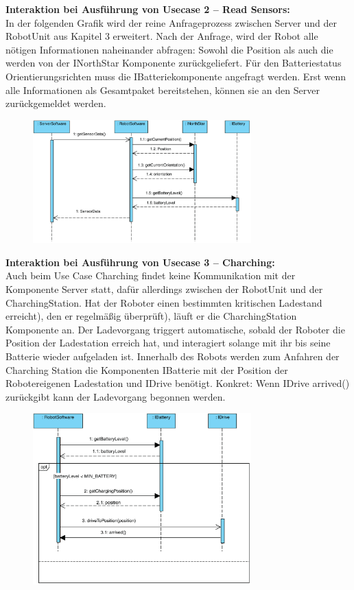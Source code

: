 	
	\textbf{Interaktion bei Ausführung von Usecase 2 – Read Sensors:}\\
	In der folgenden Grafik wird der reine Anfrageprozess zwischen Server und der RobotUnit aus Kapitel 3 erweitert. Nach der Anfrage, wird der Robot alle nötigen Informationen naheinander abfragen: Sowohl die Position als auch die werden von der INorthStar Komponente zurückgeliefert. Für den Batteriestatus Orientierungsrichten muss die IBatteriekomponente angefragt werden. Erst wenn alle Informationen als Gesamtpaket bereitstehen, können sie an den Server zurückgemeldet werden.\\
	\begin{figure}[H]
		\centering
		\includegraphics[width=0.75\textwidth]{img/8-readSensors}
		\label{Read Sensors}
	\end{figure}
	
	\textbf{Interaktion bei Ausführung von Usecase 3 – Charching:}\\
	Auch beim Use Case Charching findet keine Kommunikation mit der Komponente Server statt, dafür allerdings zwischen der RobotUnit und der CharchingStation. Hat der Roboter einen bestimmten kritischen Ladestand erreicht), den er regelmäßig überprüft), läuft er die CharchingStation Komponente an. Der Ladevorgang triggert automatische, sobald der Roboter die Position der Ladestation erreich hat, und interagiert solange mit ihr bis seine Batterie wieder aufgeladen ist. Innerhalb des Robots werden zum Anfahren der Charching Station die Komponenten IBatterie mit der Position der Robotereigenen Ladestation und IDrive benötigt. Konkret: Wenn IDrive arrived() zurückgibt kann der Ladevorgang begonnen werden.\\
	\begin{figure}[H]
		\centering
		\includegraphics[width=0.75\textwidth]{img/8-charging}
		\label{Charching}
	\end{figure}
